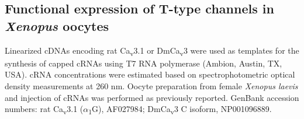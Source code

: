 \subsection*{Functional expression of T-type channels in \emph{Xenopus} oocytes}

Linearized cDNAs encoding rat Ca\textsubscript{v}3.1 or DmCa\textsubscript{v}3 were used as templates for the synthesis of capped cRNAs using T7 RNA polymerase (Ambion, Austin, TX, USA).
cRNA concentrations were estimated based on spectrophotometric optical density measurements at 260 nm.
Oocyte preparation from female \emph{Xenopus laevis} and injection of cRNAs was performed as previously reported\cite{kang:2006aa}.
GenBank accession numbers: rat Ca\textsubscript{v}3.1 ($\alpha$\textsubscript{1}G), AF027984\cite{PerezReyes:1998gn}; DmCa\textsubscript{v}3 C isoform, NP001096889.

  